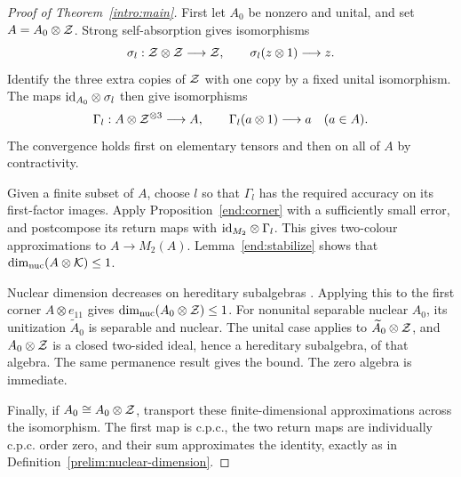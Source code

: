 \begin{proof}[Proof of Theorem~\ref{intro:main}]
First let $A_0$ be nonzero and unital, and set $A=A_0\otimes\mathcal Z$.
Strong self-absorption gives isomorphisms
\[
 \sigma_l:\mathcal Z\otimes\mathcal Z\longrightarrow\mathcal Z,
 \qquad \sigma_l(z\otimes1)\longrightarrow z.
\]
Identify the three extra copies of $\mathcal Z$ with one copy by a fixed
unital isomorphism. The maps $\mathrm{id}_{A_0}\otimes\sigma_l$ then give
isomorphisms
\[
 \Gamma_l:A\otimes\mathcal Z^{\otimes3}\longrightarrow A,
 \qquad \Gamma_l(a\otimes1)\longrightarrow a\quad(a\in A).
\]
The convergence holds first on elementary tensors and then on all
of $A$ by contractivity.

Given a finite subset of $A$, choose $l$ so that $\Gamma_l$ has the
required accuracy on its first-factor images. Apply
Proposition~\ref{end:corner} with a sufficiently small error, and
postcompose its return maps with $\mathrm{id}_{M_2}\otimes\Gamma_l$.
This gives two-colour approximations to $A\to M_2(A)$.
Lemma~\ref{end:stabilize} shows that
$\dim_{\mathrm{nuc}}(A\otimes\mathcal K)\le1$.

Nuclear dimension decreases on hereditary subalgebras
\cite[Proposition~2.5]{WZNuclear}. Applying this to the first corner
$A\otimes e_{11}$ gives $\dim_{\mathrm{nuc}}(A_0\otimes\mathcal Z)\le1$.
For nonunital separable nuclear $A_0$, its unitization
$\widetilde A_0$ is separable and nuclear. The unital case applies
to $\widetilde A_0\otimes\mathcal Z$, and $A_0\otimes\mathcal Z$ is a closed
two-sided ideal, hence a hereditary subalgebra, of that algebra.
The same permanence result gives the bound. The zero algebra is
immediate.

Finally, if $A_0\cong A_0\otimes\mathcal Z$, transport these
finite-dimensional approximations across the isomorphism. The first
map is c.p.c., the two return maps are individually c.p.c. order zero,
and their sum approximates the identity, exactly as in
Definition~\ref{prelim:nuclear-dimension}.
\end{proof}

